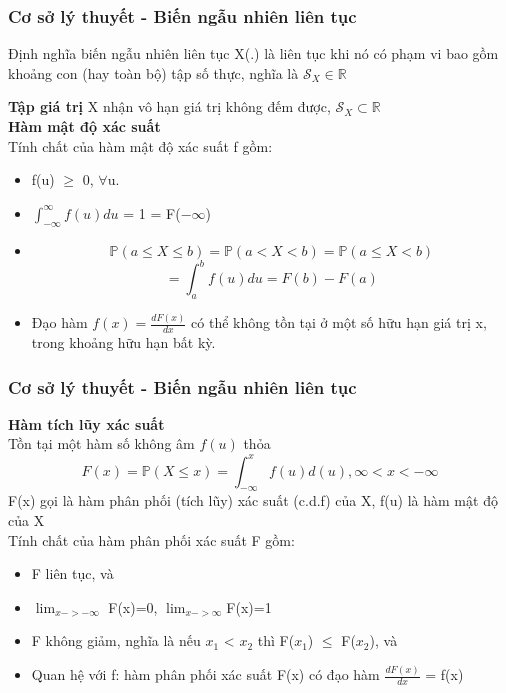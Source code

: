 \documentclass[t]{beamer}
\begin{document}

\begin{frame}[t]
\frametitle{Cơ sở lý thuyết - Biến ngẫu nhiên liên tục}
\begin{block}{Định nghĩa biến ngẫu nhiên liên tục}
X(.) là liên tục khi nó có phạm vi bao gồm khoảng con (hay toàn bộ) tập số thực, nghĩa là $\mathcal{S}_X \in \mathbb{R}$
\end{block}
\textbf{Tập giá trị} X nhận vô hạn giá trị không đếm được, $\mathcal{S}_X \subset \mathbb{R}$\\
\textbf{Hàm mật độ xác suất}\\
Tính chất của hàm mật độ xác suất f gồm:
\begin{itemize}
\item f(u) $\geq$ 0, $\forall$u.
\item $\int_{-\infty}^{\infty} f(u)du$ = 1 = F($-\infty$)
\item 
\[
\mathbb{P}(a \leq X \leq b) = \mathbb{P}(a < X < b) = \mathbb{P}(a \leq X < b)
\]
\[
 = \int_{a}^{b} f(u)du = F(b) - F(a)
\]
\item Đạo hàm $f(x) = \frac{dF(x)}{dx}$ có thể không tồn tại ở một số hữu hạn giá trị x, trong khoảng hữu hạn bất kỳ.   
\end{itemize}
\end{frame}


\begin{frame}[t]
\frametitle{Cơ sở lý thuyết - Biến ngẫu nhiên liên tục}
\textbf{Hàm tích lũy xác suất}\\
Tồn tại một hàm số không âm $f(u)$ thỏa
\[
F(x) = \mathbb{P}(X \leq x) = \int_{-\infty}^{x} f(u)d(u), \infty < x < -\infty 
\]
F(x) gọi là hàm phân phối (tích lũy) xác suất (c.d.f) của X, f(u) là hàm mật độ của X\\
Tính chất của hàm phân phối xác suất F gồm:
\begin{itemize}
\item F liên tục, và
\item $\lim_{x->-\infty}$ F(x)=0, $\lim_{x->\infty}$F(x)=1
\item F không giảm, nghĩa là nếu $x_1$ < $x_2$ thì F($x_1$) $\leq$ F($x_2$), và
\item Quan hệ với f: hàm phân phối xác suất F(x) có đạo hàm $\frac{dF(x)}{dx}$ = f(x)     
\end{itemize}
\end{frame}
\end{document}
